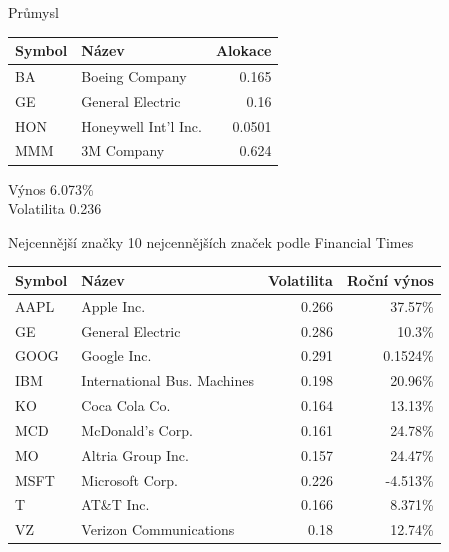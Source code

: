 \begin{frame}{Průmysl}
      \begin{tabular}{|l|l|r|}
        \hline
        Symbol&Název&Alokace\\\hline\hline
        BA&Boeing Company &0.165\\\hline
        GE&General Electric &0.16\\\hline
        HON&Honeywell Int'l Inc. &0.0501\\\hline
        MMM&3M Company &0.624\\\hline
      \end{tabular}
      
      Výnos 6.073\%\\
      Volatilita 0.236
\end{frame}

\begin{frame}{Nejcennější značky}
10 nejcennějších značek podle Financial Times\cite{ft}\\ 
      \begin{tabular}{|l|l|r|r|}
        \hline
        Symbol&Název&Volatilita&Roční výnos\\\hline\hline
        AAPL&Apple Inc. &0.266&37.57\%\\\hline
        GE&General Electric &0.286&10.3\%\\\hline
        GOOG&Google Inc. &0.291&0.1524\%\\\hline
        IBM&International Bus. Machines &0.198&20.96\%\\\hline
        KO&Coca Cola Co. &0.164&13.13\%\\\hline
        MCD&McDonald's Corp. &0.161&24.78\%\\\hline
        MO&Altria Group Inc. &0.157&24.47\%\\\hline
        MSFT&Microsoft Corp. &0.226&-4.513\%\\\hline
        T&AT\&T Inc. &0.166&8.371\%\\\hline
        VZ&Verizon Communications &0.18&12.74\%\\\hline
      \end{tabular}
\end{frame}

